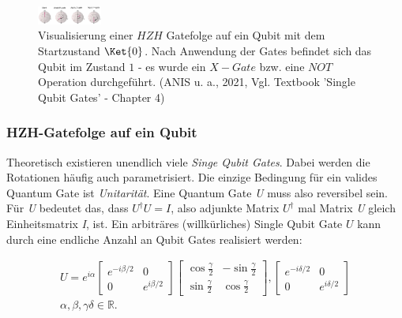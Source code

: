 \begin{figure}
    \centering
    \includegraphics[width=80]{content/HZH_gate_operation.JPG}
    \caption{Visualisierung einer \(HZH\) Gatefolge auf ein Qubit mit dem Startzustand \(\Ket{0}\). 
    Nach Anwendung der Gates befindet sich das Qubit im Zustand \(1\) - es wurde ein \(X-Gate\) bzw. 
    eine \(NOT\) Operation durchgeführt. (ANIS u. a., 2021, Vgl. Textbook ’Single Qubit Gates’ - Chapter 4)}
\end{figure} \newline
\subsubsection{HZH-Gatefolge auf ein Qubit}
\newline

Theoretisch existieren unendlich viele \textit{Singe Qubit Gates}. Dabei werden die Rotationen häufig auch parametrisiert. Die einzige Bedingung für ein valides Quantum Gate ist \textit{Unitarität}. Eine Quantum Gate \textit{U} muss also reversibel sein. Für \textit{U} bedeutet das, dass \(U^\dagger U = I\), also adjunkte Matrix \({U^\dagger}\) mal Matrix \textit{U} gleich Einheitsmatrix \textit{I}, ist.
\newline
Ein arbiträres (willkürliches) Single Qubit Gate \(U\) kann durch eine endliche Anzahl an Qubit Gates realisiert werden:

\begin{equation}\begin{gathered}

        U = e^{i\alpha} \begin{bmatrix}
            e^{-i\beta/2} & 0            \\
            0             & e^{i\beta/2}
        \end{bmatrix} \begin{bmatrix}
            \cos \frac{\gamma}{2} & -\sin \frac{\gamma}{2} \\
            \sin \frac{\gamma}{2} & \cos \frac{\gamma}{2}
        \end{bmatrix},
        \begin{bmatrix}
            e^{-i\delta/2} & 0             \\
            0              & e^{i\delta/2}
        \end{bmatrix}
        \\ \alpha, \beta, \gamma \delta \in \mathbb{R}.
    \end{gathered}\end{equation}


